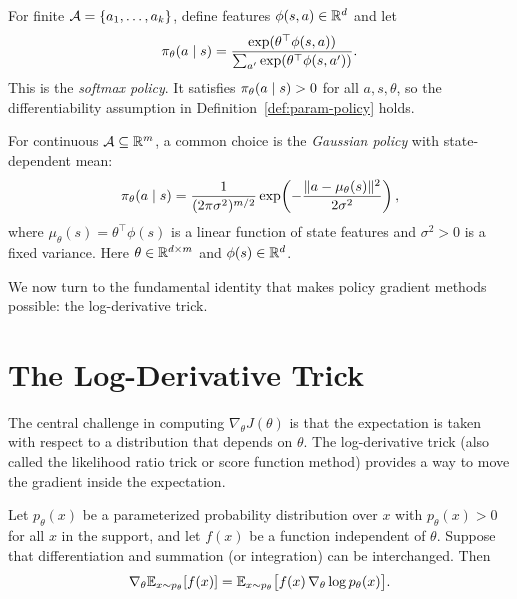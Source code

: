 \documentclass[11pt,a4paper]{article}
\begin{document}
\begin{example}
\label{ex:softmax-policy}
For finite $\mathcal{A} = \{a_1, \ldots, a_k\}$, define features
$\phi(s,a) \in \mathbb{R}^d$ and let
\[
  \pi_\theta(a \mid s) = \frac{\exp(\theta^\top \phi(s,a))}
  {\sum_{a'} \exp(\theta^\top \phi(s,a'))}.
\]
This is the \emph{softmax policy}. It satisfies
$\pi_\theta(a \mid s) > 0$ for all $a, s, \theta$, so the
differentiability assumption in Definition~\ref{def:param-policy} holds.
\end{example}

\begin{example}
\label{ex:gaussian-policy}
For continuous $\mathcal{A} \subseteq \mathbb{R}^m$, a common choice is the
\emph{Gaussian policy} with state-dependent mean:
\[
  \pi_\theta(a \mid s) = \frac{1}{(2\pi\sigma^2)^{m/2}}
  \exp\!\left(-\frac{\|a - \mu_\theta(s)\|^2}{2\sigma^2}\right),
\]
where $\mu_\theta(s) = \theta^\top \phi(s)$ is a linear function of
state features and $\sigma^2 > 0$ is a fixed variance. Here
$\theta \in \mathbb{R}^{d \times m}$ and $\phi(s) \in \mathbb{R}^d$.
\end{example}

We now turn to the fundamental identity that makes policy gradient
methods possible: the log-derivative trick.

\section{The Log-Derivative Trick}

The central challenge in computing $\nabla_\theta J(\theta)$ is that the
expectation is taken with respect to a distribution that depends on
$\theta$. The log-derivative trick (also called the likelihood ratio
trick or score function method) provides a way to move the gradient
inside the expectation.

\begin{lemma}
\label{lem:score}
Let $p_\theta(x)$ be a parameterized probability distribution over $x$
with $p_\theta(x) > 0$ for all $x$ in the support, and let $f(x)$ be a
function independent of $\theta$. Suppose that differentiation and
summation (or integration) can be interchanged. Then
\[
  \nabla_\theta \mathbb{E}_{x \sim p_\theta}[f(x)]
  = \mathbb{E}_{x \sim p_\theta}\bigl[f(x)\, \nabla_\theta \log p_\theta(x)\bigr].
\]
\end{lemma}
\end{document}
